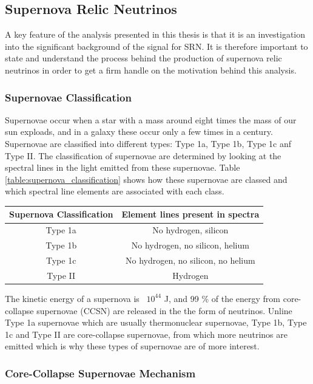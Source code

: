 \subsection{Supernova Relic Neutrinos}

A key feature of the analysis presented in this thesis is that it is an investigation into the significant background of the signal for SRN. It is therefore important to state and understand the process behind the production of supernova relic neutrinos in order to get a firm handle on the motivation behind this analysis. 

\subsubsection{Supernovae Classification}
Supernovae occur when a star with a mass around eight times the mass of our sun exploads, and in a galaxy these occur only a few times in a century. Supernovae are classified into different types: Type 1a, Type 1b, Type 1c anf Type II. The classification of supernovae are determined by looking at the spectral lines in the light emitted from these supernovae. Table \ref{table:supernova_classification} shows how these supernovae are classed and which spectral line elements are associated with each class. 

\begin{center}
\begin{tabular}{||c c||} 
    \hline
    Supernova Classification & Element lines present in spectra \\ 
    \hline \hline
    Type 1a & No hydrogen, silicon  \\ 
    \hline
    Type 1b & No hydrogen, no silicon, helium  \\
    \hline
    Type 1c & No hydrogen, no silicon, no helium  \\
    \hline
    Type II & Hydrogen  \\
    \hline \hline
\end{tabular}
\end{center}

The kinetic energy of a supernova is ~$10^{44}$ J, and 99 \% of the energy from core-collapse supernovae (CCSN) are released in the the form of neutrinos. Unline Type 1a supernovae which are usually thermonuclear supernovae, Type 1b, Type 1c and Type II are core-collapse supernovae, from which more neutrinos are emitted which is why these types of supernovae are of more interest. 

\subsubsection{Core-Collapse Supernovae Mechanism}

